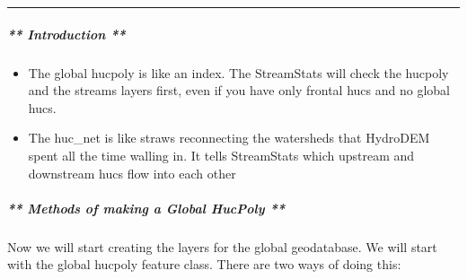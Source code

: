 \documentclass[letterpaper,10pt,english]{sphinxmanual}
\begin{document}
\bigskip\hrule\bigskip



\subparagraph{** Introduction **}
\label{\detokenize{ex_2:id1}}\begin{itemize}
\item {} 
The global hucpoly is like an index. The StreamStats will check the hucpoly and the streams layers first, even if you have only frontal hucs and no global hucs.

\item {} 
The huc\_net is like straws reconnecting the watersheds that HydroDEM spent all the time walling in. It tells StreamStats which upstream and downstream hucs flow into each other

\end{itemize}


\subparagraph{** Methods of making a Global HucPoly **}
\label{\detokenize{ex_2:methods-of-making-a-global-hucpoly}}
Now we will start creating the layers for the global geodatabase.  We will start with the global hucpoly feature class. There are two ways of doing this:
\end{document}
